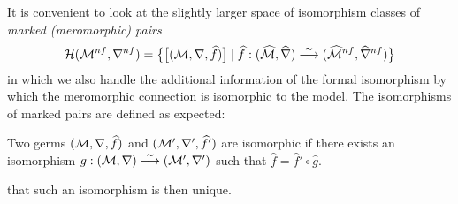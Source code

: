 It is convenient to look at the slightly larger space of isomorphism classes of
\emph{marked (meromorphic) pairs}
\[
  \mathcal{H}(\mathcal{M}^{nf},\nabla^{nf})=\bigl\{
    \bigl[(\mathcal{M},\nabla,\widehat f)\bigr]
      \mid
      \widehat f:(\widehat{\mathcal{M}},\widehat\nabla)
        \overset{\sim}\longrightarrow
        (\widehat{\mathcal{M}}^{nf},\widehat\nabla^{nf})
  \bigr\}
\]
in which we also handle the additional information of the formal isomorphism by
which the meromorphic connection is isomorphic to the model.
The isomorphisms of marked pairs are defined as expected:
\begin{defn}\label{defn:isomsOfPairs}
  Two germs $(\mathcal{M},\nabla,\widehat f)$ and $(\mathcal{M}',\nabla',\widehat f')$ are
  isomorphic if there exists an isomorphism
  $g:(\mathcal{M},\nabla)\overset{\sim}\longrightarrow(\mathcal{M}',\nabla')$ such that
  $\hat f=\hat f'\circ \hat g$.
  \begin{s-rem}
     \cite[111]{sabbah2007isomonodromic} that such
    an isomorphism is then unique.
  \end{s-rem}
\end{defn}


